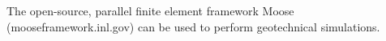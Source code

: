 The open-source, parallel finite element framework Moose (mooseframework.inl.gov) can be used to perform geotechnical simulations.
